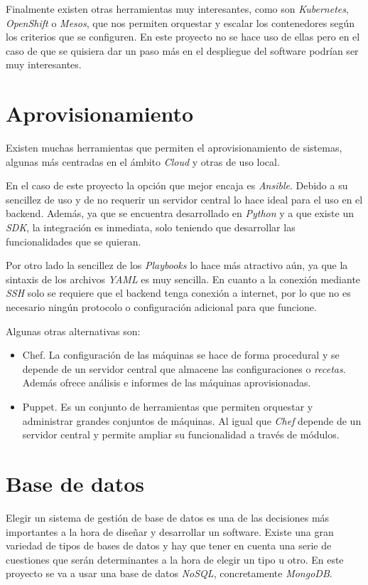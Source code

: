 Finalmente existen otras herramientas muy interesantes, como son \textit{Kubernetes}, \textit{OpenShift} o \textit{Mesos}, que nos permiten orquestar y escalar los contenedores según los criterios que se configuren. En este proyecto no se hace uso de ellas pero en el caso de que se quisiera dar un paso más en el despliegue del software podrían ser muy interesantes.


\section{Aprovisionamiento}

Existen muchas herramientas que permiten el aprovisionamiento de sistemas, algunas más centradas en el ámbito \textit{Cloud} y otras de uso local.

En el caso de este proyecto la opción que mejor encaja es \textit{Ansible}. Debido a su sencillez de uso y de no requerir un servidor central lo hace ideal para el uso en el backend. Además, ya que se encuentra desarrollado en \textit{Python} y a que existe un \textit{SDK}, la integración es inmediata, solo teniendo que desarrollar las funcionalidades que se quieran.

Por otro lado la sencillez de los \textit{Playbooks} lo hace más atractivo aún, ya que la sintaxis de los archivos \textit{YAML}  es muy sencilla. En cuanto a la conexión mediante \textit{SSH} solo se requiere que el backend tenga conexión a internet, por lo que no es necesario ningún protocolo o configuración adicional para que funcione.

\bigskip
Algunas otras alternativas son:
\begin{itemize}
	\item Chef. La configuración de las máquinas se hace de forma procedural y se depende de un servidor central que almacene las configuraciones o \textit{recetas}. Además ofrece análisis e informes de las máquinas aprovisionadas.
	\item Puppet. Es un conjunto de herramientas que permiten orquestar y administrar grandes conjuntos de máquinas. Al igual que \textit{Chef} depende de un servidor central y permite ampliar su funcionalidad a través de módulos.
\end{itemize}

\section{Base de datos}


Elegir un sistema de gestión de base de datos es una de las decisiones más importantes a la hora de diseñar y desarrollar un software. Existe una gran variedad de tipos de bases de datos y hay que tener en cuenta una serie de cuestiones que serán determinantes a la hora de elegir un tipo u otro. En este proyecto se va a usar una base de datos \textit{NoSQL}, concretamente \textit{MongoDB}.

